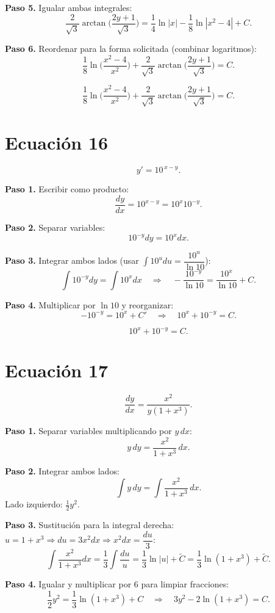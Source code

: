 \documentclass[12pt,a4paper]{article}
\begin{document}
\begin{multicols}{2}
	\textbf{Paso 5.} Igualar ambas integrales:
	\[
	\frac{2}{\sqrt{3}}\arctan\!\Big(\frac{2y+1}{\sqrt{3}}\Big)
	=\frac{1}{4}\ln|x|-\frac{1}{8}\ln|x^{2}-4|+C.
	\]
	
	\textbf{Paso 6.} Reordenar para la forma solicitada (combinar logaritmos):
	\[
	\frac{1}{8}\ln\!\Big(\frac{x^{2}-4}{x^{2}}\Big)+\frac{2}{\sqrt{3}}\arctan\!\Big(\frac{2y+1}{\sqrt{3}}\Big)=C.
	\]
	
	\[
	\boxed{\displaystyle \frac{1}{8}\ln\!\Big(\frac{x^{2}-4}{x^{2}}\Big)+\frac{2}{\sqrt{3}}\arctan\!\Big(\frac{2y+1}{\sqrt{3}}\Big)=C.}
	\]
	
	\section*{Ecuación 16}
	\[
	y' = 10^{\,x-y}.
	\]
	
	\textbf{Paso 1.} Escribir como producto:
	\[
	\frac{dy}{dx}=10^{x-y}=10^{x}10^{-y}.
	\]
	
	\textbf{Paso 2.} Separar variables:
	\[
	10^{-y}dy = 10^{x}dx.
	\]
	
	\textbf{Paso 3.} Integrar ambos lados (usar \(\int 10^{u}du=\dfrac{10^{u}}{\ln 10}\)):
	\[
	\int 10^{-y}dy=\int 10^{x}dx
	\quad\Rightarrow\quad
	-\frac{10^{-y}}{\ln 10}=\frac{10^{x}}{\ln 10}+C.
	\]
	
	\textbf{Paso 4.} Multiplicar por \(\ln 10\) y reorganizar:
	\[
	-10^{-y}=10^{x}+C' \quad\Rightarrow\quad 10^{x}+10^{-y}=C.
	\]
	
	\[
	\boxed{10^{x}+10^{-y}=C.}
	\]
	
	\section*{Ecuación 17}
	\[
	\frac{dy}{dx}=\frac{x^{2}}{y(1+x^{3})}.
	\]
	
	\textbf{Paso 1.} Separar variables multiplicando por \(y\,dx\):
	\[
	y\,dy=\frac{x^{2}}{1+x^{3}}\,dx.
	\]
	
	\textbf{Paso 2.} Integrar ambos lados:
	\[
	\int y\,dy=\int\frac{x^{2}}{1+x^{3}}\,dx.
	\]
	Lado izquierdo: \(\tfrac{1}{2}y^{2}\).
	
	\textbf{Paso 3.} Sustitución para la integral derecha: \(u=1+x^{3}\Rightarrow du=3x^{2}dx\Rightarrow x^{2}dx=\dfrac{du}{3}\):
	\[
	\int\frac{x^{2}}{1+x^{3}}dx=\frac{1}{3}\int\frac{du}{u}=\frac{1}{3}\ln|u|+\tilde C=\frac{1}{3}\ln(1+x^{3})+\tilde C.
	\]
	
	\textbf{Paso 4.} Igualar y multiplicar por 6 para limpiar fracciones:
	\[
	\frac{1}{2}y^{2}=\frac{1}{3}\ln(1+x^{3})+C
	\quad\Rightarrow\quad
	3y^{2}-2\ln(1+x^{3})=C.
	\]
	

\end{multicols}
\end{document}
